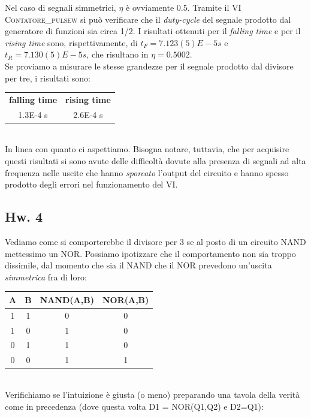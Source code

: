 \documentclass[journal, a4paper]{IEEEtran}
\begin{document}
Nel caso di segnali simmetrici, $\eta$ è ovviamente 0.5. Tramite il VI \textsc{Contatore\_pulsew} si può verificare che il \textit{duty-cycle} del segnale prodotto dal generatore di funzioni sia circa 1/2. I risultati ottenuti per il \textit{falling time} e per il \textit{rising time} sono, rispettivamente, di $t_F = 7.123(5)E-5 s$ e $t_R = 7.130(5)E-5 s$, che risultano in $\eta = 0.5002$.\\
Se proviamo a misurare le stesse grandezze per il segnale prodotto dal divisore per tre, i risultati sono: 

\begin{table}[h]
\centering
\begin{tabular}{c|c}
\hline \textbf{falling time} & \textbf{rising time} \\ 
 1.3E-4 s & 2.6E-4 s \\ 
\hline 
\end{tabular}   
\end{table}
~\\
In linea con quanto ci aspettiamo. Bisogna notare, tuttavia, che per acquisire questi risultati si sono avute delle difficoltà dovute alla presenza di segnali ad alta frequenza nelle uscite che hanno \textit{sporcato} l'output del circuito e hanno spesso prodotto degli errori nel funzionamento del VI. 

\subsection{Hw. 4}
Vediamo come si comporterebbe il divisore per 3 se al posto di un circuito \textsc{NAND} mettessimo un \textsc{NOR}. Possiamo ipotizzare che il comportamento non sia troppo dissimile, dal momento che sia il \textsc{NAND} che il \textsc{NOR} prevedono un'uscita \textit{simmetrica} fra di loro:

\begin{table}[h]
\centering
\begin{tabular}{c|c||c|c}
\hline \textbf{A} & \textbf{B} & \textbf{NAND(A,B)} & \textbf{NOR(A,B)} \\ 
\hline 1 & 1 & 0 & 0 \\ 
 1 & 0 & 1 & 0 \\ 
 0 & 1 & 1 & 0 \\ 
 0 & 0 & 1 & 1 \\ 
\hline
 
\end{tabular} 
\end{table}
~\\
Verifichiamo se l'intuizione è giusta (o meno) preparando una tavola della verità come in precedenza (dove questa volta D1 = NOR(Q1,Q2) e D2=Q1):
\end{document}
